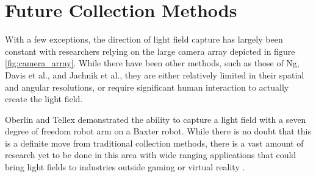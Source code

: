 \documentclass[12pt]{report}
\begin{document}
\section{Future Collection Methods}
With a few exceptions, the direction of light field capture has largely been constant with researchers relying on the large camera array depicted in figure \ref{fig:camera_array}. While there have been other methods, such as those of Ng, Davis et al., and Jachnik et al., they are either relatively limited in their spatial and angular resolutions, or require significant human interaction to actually create the light field.

Oberlin and Tellex demonstrated the ability to capture a light field with a seven degree of freedom robot arm on a Baxter robot. While there is no doubt that this is a definite move from traditional collection methods, there is a vast amount of research yet to be done in this area with wide ranging applications that could bring light fields to industries outside gaming or virtual reality \cite{Oberlin16}.
\end{document}
